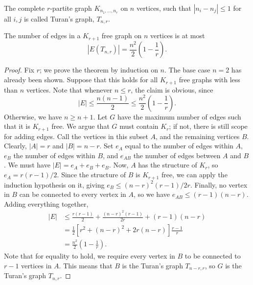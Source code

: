 \documentclass[11pt]{article}
\theoremstyle{definition}
\theoremstyle{remark}
\numberwithin{equation}{section}
\begin{document}
    \begin{definition}
        The complete $r$-partite graph $K_{n_1, \dots, n_r}$ on $n$ vertices, such
        that $|n_i - n_j| \leq 1$ for all $i, j$ is called Turan's graph, $T_{n, r}$.
    \end{definition}

    \begin{theorem}
        The number of edges in a $K_{r + 1}$ free graph on $n$ vertices is at most \[
            |E(T_{n, r})| = \frac{n^2}{2} \left(1 - \frac{1}{r}\right).
        \]
    \end{theorem}
    \begin{proof}
        Fix $r$; we prove the theorem by induction on $n$. The base case $n = 2$ has
        already been shown. Suppose that this holds for all $K_{r + 1}$ free graphs
        with less than $n$ vertices. Note that whenever $n \leq r$, the claim is
        obvious, since \[
            |E| \leq \frac{n (n - 1)}{2} \leq \frac{n^2}{2}\left(1 -
            \frac{1}{r}\right).
        \] Otherwise, we have $n \geq n + 1$. Let $G$ have the maximum number of
        edges such that it is $K_{r + 1}$ free. We argue that $G$ must contain $K_r$;
        if not, there is still scope for adding edges. Call the vertices in this
        subset $A$, and the remaining vertices $B$. Clearly, $|A| = r$ and $|B| = n -
        r$. Set $e_A$ equal to the number of edges within $A$, $e_B$ the number of
        edges within $B$, and $e_{AB}$ the number of edges between $A$ and $B$. We
        must have $|E| = e_A + e_B + e_B$. Now, $A$ has the structure of $K_r$, so
        $e_A = r(r - 1) / 2$. Since the structure of $B$ is $K_{r + 1}$ free, we can
        apply the induction hypothesis on it, giving $e_{B} \leq (n - r)^2(r - 1) /
        2r$. Finally, no vertex in $B$ can be connected to every vertex in $A$, so we
        have $e_{AB} \leq (r - 1)(n - r)$. Adding everything together, 
        \begin{align*}
            |E| &\leq \frac{r (r - 1)}{2} + \frac{(n - r)^2(r - 1)}{2r} + (r - 1)(n -
            r) \\
            &= \frac{1}{2} \left[r^2 + (n - r)^2 + 2r(n - r)\right]\frac{r - 1}{r} \\
            &= \frac{n^2}{2}\left(1 - \frac{1}{r}\right).
        \end{align*}
        Note that for equality to hold, we require every vertex in $B$ to be
        connected to $r - 1$ vertices in $A$. This means that $B$ is the Turan's
        graph $T_{n - r, r}$, so $G$ is the Turan's graph $T_{n, r}$.
    \end{proof}
\end{document}
